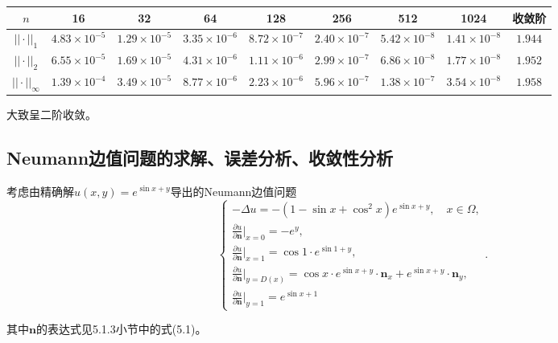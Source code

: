 \documentclass[lang=cn,10pt]{elegantbook}
\begin{document}
\begin{table}[H]
  \centering
  \small
  \begin{tabular}{c|ccccccc|c}
  \textbf{$n$}        & 16                   & 32                   & 64                   & 128                  & 256                  & 512                  & 1024                  & 收敛阶 \\ \hline
  $||\cdot||_1$      & $4.83\times 10^{-5}$ & $1.29\times 10^{-5}$ & $3.35\times 10^{-6}$ & $8.72\times 10^{-7}$ & $2.40\times 10^{-7}$ & $5.42\times 10^{-8}$ & $1.41\times 10^{-8}$ & $1.944$\\
  $||\cdot||_2$      & $6.55\times 10^{-5}$ & $1.69\times 10^{-5}$ & $4.31\times 10^{-6}$ & $1.11\times 10^{-6}$ & $2.99\times 10^{-7}$ & $6.86\times 10^{-8}$ & $1.77\times 10^{-8}$ & $1.952$\\
  $||\cdot||_\infty$ & $1.39\times 10^{-4}$ & $3.49\times 10^{-5}$ & $8.77\times 10^{-6}$ & $2.23\times 10^{-6}$ & $5.96\times 10^{-7}$ & $1.38\times 10^{-7}$ & $3.54\times 10^{-8}$ & $1.958$
  \end{tabular}
\end{table}

大致呈二阶收敛。

\subsection{Neumann边值问题的求解、误差分析、收敛性分析}

考虑由精确解$u(x,y)=e^{\sin x+y}$导出的Neumann边值问题
\begin{equation}
  \left\{
    \begin{array}{l}
      -\Delta u = -(1-\sin x+\cos^2 x)e^{\sin x + y},\quad x\in\Omega, \\
      \frac{\partial u}{\partial \mathbf{n}}|_{x=0}=-e^{y},\\
      \frac{\partial u}{\partial \mathbf{n}}|_{x=1}=\cos 1 \cdot e^{\sin 1 + y},\\
      \frac{\partial u}{\partial \mathbf{n}}|_{y=D(x)}=\cos x\cdot e^{\sin x + y} \cdot \mathbf{n}_x + e^{\sin x + y} \cdot \mathbf{n}_y,\\
      \frac{\partial u}{\partial \mathbf{n}}|_{y=1}=e^{\sin x+1}
    \end{array}
  \right. .
\end{equation}

其中$\mathbf{n}$的表达式见5.1.3小节中的式(5.1)。
\end{document}
